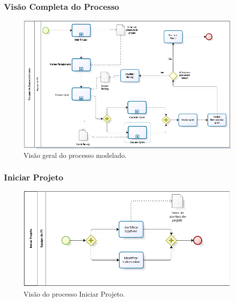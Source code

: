 \begin{landscape}
\subsubsection{Visão Completa do Processo}

\begin{figure}[H]
	\centering
	\label{Visão geral do processo modelado}
		\includegraphics[keepaspectratio=true,scale=0.9,angle=360]{processo/ProcessoCompleto.png}
	\caption{Visão geral do processo modelado.}
\end{figure}
\end{landscape}
\subsubsection{Iniciar Projeto}

\begin{figure}[H]
	\centering
	\label{Visão do processo Iniciar Projeto}
		\includegraphics[keepaspectratio=true,scale=0.7,angle=360]{processo/IniciarProjeto.png}
	\caption{Visão do processo Iniciar Projeto.}
\end{figure}

